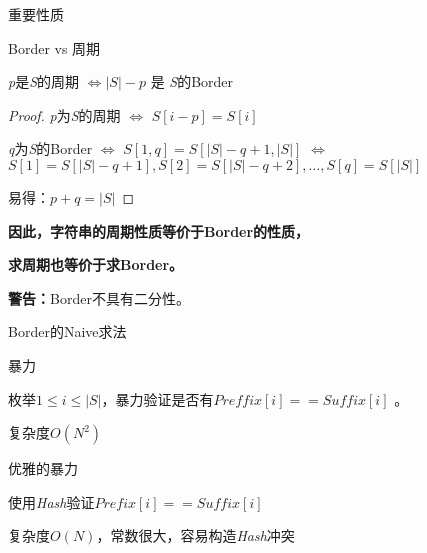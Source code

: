\documentclass{ctexbeamer}		%
\begin{document}
\begin{frame}{重要性质}

\begin{block}{Border vs 周期}

\textit{p}是\textit{S}的周期 $\Leftrightarrow |S| - p$ 是 \textit{S}的Border 

\end{block}

\pause

\begin{proof}
    \textit{p}为\textit{S}的周期 $\Leftrightarrow$ $S[i-p] = S[i]$
    
    \textit{q}为\textit{S}的Border $\Leftrightarrow$ $S[1,q] = S[|S| - q + 1, |S|]$ $\Leftrightarrow$ $S[1] = S[|S| - q + 1], S[2] = S[|S| - q + 2],\dots , S[q] = S[|S|]$
    
    易得：$p + q = |S|$
\end{proof}
    
\pause

\hphantom{ }

\textbf{因此，字符串的周期性质等价于Border的性质，}

\textbf{求周期也等价于求Border。}

\hphantom{ }

\color{red}\textbf{警告：}Border不具有二分性。

\end{frame}

\begin{frame}{Border的Naive求法}

\begin{block}{暴力}

枚举$1 \leq i \leq |S|$，暴力验证是否有$Preffix[i] == Suffix[i]$ 。

\hphantom{}

复杂度$O(N^2)$

\end{block}

\pause

\begin{block}{优雅的暴力}

使用\textit{Hash}验证$Prefix[i] == Suffix[i]$

\hphantom{}

复杂度$O(N)$，常数很大，容易构造\textit{Hash}冲突

\end{block}

\end{frame}
\end{document}
